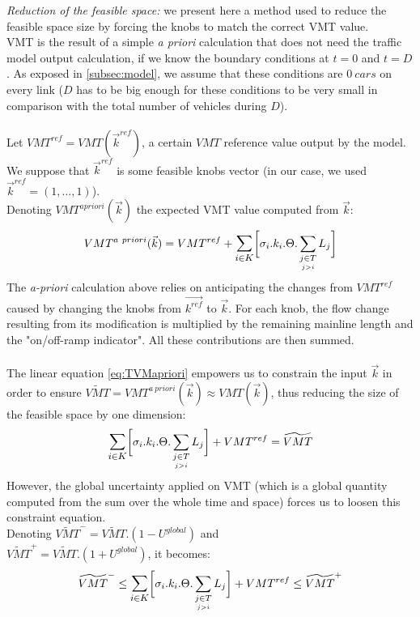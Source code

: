 \emph{Reduction of the feasible space:} we present here a method used to reduce the feasible space size by forcing the knobs to match the correct VMT value.\\
VMT is the result of a simple \emph{a priori} calculation that does not need the traffic model output calculation, if we know the boundary conditions at $t=0$ and $t=D$. As exposed in \ref{subsec:model}, we assume that these conditions are $0\ cars$ on every link ($D$ has to be big enough for these conditions to be very small in comparison with the total number of vehicles during $D$).\\
\\
Let $VMT^{ref}=VMT(\vec{k}^{ref})$, a certain $VMT$ reference value output by the model. We suppose that $\vec{k}^{ref}$ is some feasible knobs vector (in our case, we used $\vec{k}^{ref}=(1,...,1)$).\\
Denoting $VMT^{a priori}(\vec{k})$ the expected VMT value computed from $\vec{k}$:\\
\begin{equation}
	\label{eq:TVMapriori}
	VMT^{a\ priori}(\vec{k})=VMT^{ref}+\mathlarger{\sum\limits_{i\in K}}\biggl[\sigma_{i}.k_{i}.\Theta.	\sum\limits_{\underset{j>i}{j\in T}}L_{j}\biggr]
\end{equation}	
The \emph{a-priori} calculation above relies on anticipating the changes from $VMT^{ref}$ caused by changing the knobs from $\vec{k^{ref}}$ to $\vec{k}$. For each knob, the flow change resulting from its modification is multiplied by the remaining mainline length and the "on/off-ramp indicator". All these contributions are then summed.\\
\\
The linear equation \ref{eq:TVMapriori} empowers us to constrain the input $\vec{k}$ in order to ensure $\widetilde{VMT}=VMT^{a\ priori}(\vec{k})\approx VMT(\vec{k})$, thus reducing the size of the feasible space by one dimension:
\begin{equation*}
	\mathlarger{\sum\limits_{i\in K}}\biggl[\sigma_{i}.k_{i}.\Theta.	\sum\limits_{\underset{j>i}{j\in T}}L_{j}\biggr]+VMT^{ref}=\widetilde{VMT}
\end{equation*}
However, the global uncertainty applied on VMT (which is a global quantity computed from the sum over the whole time and space) forces us to loosen this constraint equation.\\
Denoting $\widetilde{VMT}^{-}=\widetilde{VMT}.(1-U^{global})$ and\\ $\widetilde{VMT}^{+}=\widetilde{VMT}.(1+U^{global})$, it becomes:\\
\begin{equation}	
	\label{eq:TVMineq}
	\widetilde{VMT}^{-}\leq\mathlarger{\sum\limits_{i\in K}}\biggl[\sigma_{i}.k_{i}.\Theta.	\sum\limits_{\underset{j>i}{j\in T}}L_{j}\biggr]+VMT^{ref}\leq \widetilde{VMT}^{+}
\end{equation} 